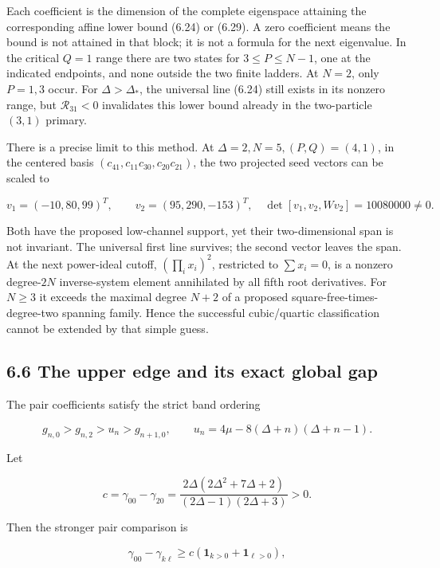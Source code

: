 \documentclass[a4paper,11pt]{article}
\numberwithin{equation}{section}
\begin{document}
Each coefficient is the dimension of the complete eigenspace attaining the corresponding affine lower bound (6.24) or (6.29). A zero coefficient means the bound is not attained in that block; it is not a formula for the next eigenvalue. In the critical \(Q=1\) range there are two states for \(3\le P\le N-1\), one at the indicated endpoints, and none outside the two finite ladders. At \(N=2\), only \(P=1,3\) occur. For \(\Delta>\Delta_*\), the universal line (6.24) still exists in its nonzero range, but \(\mathcal R_{31}<0\) invalidates this lower bound already in the two-particle \((3,1)\) primary.

There is a precise limit to this method. At \(\Delta=2,N=5,(P,Q)=(4,1)\), in the centered basis \((c_{41},c_{11}c_{30},c_{20}c_{21})\), the two projected seed vectors can be scaled to

\[
v_1=(-10,80,99)^T,\qquad v_2=(95,290,-153)^T,
\quad\det[v_1,v_2,Wv_2]=10080000\ne0.
\tag{6.37}
\]

Both have the proposed low-channel support, yet their two-dimensional span is not invariant. The universal first line survives; the second vector leaves the span. At the next power-ideal cutoff, \((\prod_i x_i)^2\), restricted to \(\sum x_i=0\), is a nonzero degree-\(2N\) inverse-system element annihilated by all fifth root derivatives. For \(N\ge3\) it exceeds the maximal degree \(N+2\) of a proposed square-free-times-degree-two spanning family. Hence the successful cubic/quartic classification cannot be extended by that simple guess.

\hypertarget{the-upper-edge-and-its-exact-global-gap}{%
\subsection{6.6 The upper edge and its exact global gap}\label{the-upper-edge-and-its-exact-global-gap}}

The pair coefficients satisfy the strict band ordering

\[
g_{n,0}>g_{n,2}>u_n>g_{n+1,0},
\qquad u_n=4\mu-8(\Delta+n)(\Delta+n-1).
\tag{6.38}
\]

Let

\[
c=\gamma_{00}-\gamma_{20}
=\frac{2\Delta(2\Delta^2+7\Delta+2)}{(2\Delta-1)(2\Delta+3)}>0.
\tag{6.39}
\]

Then the stronger pair comparison is

\[
\gamma_{00}-\gamma_{k\ell}
\ge c(\mathbf1_{k>0}+\mathbf1_{\ell>0}),
\tag{6.40}
\]
\end{document}
